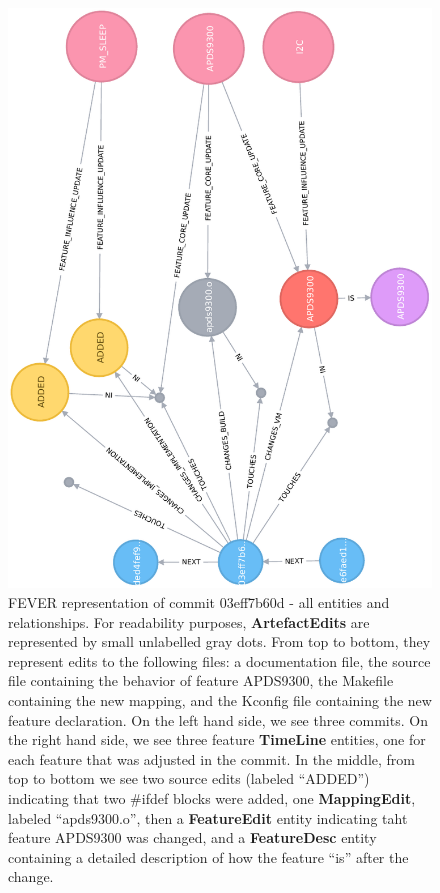 \begin{figure}[htb]
	\centering
	\includegraphics[scale=0.55,angle =-90, natwidth=450,natheight=500]{full_commit.pdf}
	\caption{FEVER representation of commit 03eff7b60d - all entities and relationships. For readability purposes, \textbf{ArtefactEdits} are
	represented by small unlabelled gray dots. From top to bottom, they represent edits to the following files: a documentation file, 
	the source file containing the  behavior of feature APDS9300, 
	the Makefile containing the new mapping, and the Kconfig file containing the new feature declaration.
	On the left hand side, we see three commits. On the right hand side, we see three feature \textbf{TimeLine} entities, one for each feature that was adjusted in the commit. In the middle, from top to bottom we see two source edits (labeled ``ADDED'') indicating that two \#ifdef blocks were added, one \textbf{MappingEdit}, labeled ``apds9300.o'', then a \textbf{FeatureEdit} entity indicating taht feature APDS9300 was changed, and a \textbf{FeatureDesc} entity containing a detailed description of how the feature ``is'' after the change.}
	\label{fig:commit_overview}
\end{figure}


